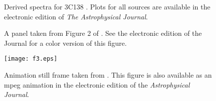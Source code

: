 \documentclass[manuscript]{aastex}
\begin{document}

\begin{figure}
\caption{Derived spectra for 3C138 \citep[see][]{heiles03}. Plots for all sources are available
in the electronic edition of {\it The Astrophysical Journal}.\label{fig1}}
\end{figure}

\clearpage


\begin{figure}
\caption{A panel taken from Figure 2 of \citet{rudnick03}. 
See the electronic edition of the Journal for a color version 
of this figure.\label{fig2}}
\end{figure}


\begin{figure}
\texttt{[image: f3.eps]}
\caption{Animation still frame taken from \citet{kim03}.
This figure is also available as an mpeg
animation in the electronic edition of the
{\it Astrophysical Journal}.}
\end{figure}




\end{document}
